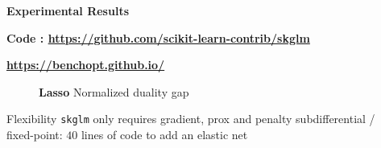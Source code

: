 \documentclass[english,final,t]{beamer}
\begin{document}
\begin{frame}{}
\begin{columns}[t]
\begin{column}{.3\linewidth}
\begin{block}{\textbf{\color{malgared}{\# 3 Anderson Acceleration}}}
		\end{block}
	\end{column}
	\begin{column}{.3\linewidth}
		\begin{block}{\textbf{\color{malgared}Experimental Results}}
			\begin{center}
					\begin{minipage}{0.9\linewidth}
					\begin{beamerboxesrounded}[lower=headerCol]{}
						\textbf{Code : \url{https://github.com/scikit-learn-contrib/skglm}}
					\end{beamerboxesrounded}
				\end{minipage}
			\end{center}
			\begin{center}
				\begin{minipage}{0.48\linewidth}
				\centering
				\begin{beamerboxesrounded}[lower=headerCol]{}
					\textbf{\url{https://benchopt.github.io/}}
				\end{beamerboxesrounded}
			\end{minipage}
			\end{center}
			\begin{figure}[tb]

				\textbf{Lasso} Normalized duality gap
			\end{figure}
			\vspace{1.5em}
			{\color{malgared}Flexibility} \texttt{skglm} only requires gradient, prox and penalty subdifferential / fixed-point: $40$ lines of code to add an elastic net

			\begin{figure}[tb]


\end{figure}
\end{block}
\end{column}
\end{columns}
\end{frame}
\end{document}
